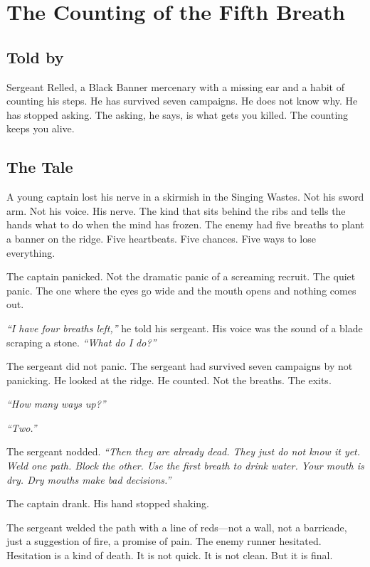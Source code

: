 \chapter{The Counting of the Fifth Breath}

\section*{Told by}
Sergeant Relled, a Black Banner mercenary with a missing ear and a habit of counting his steps. He has survived seven campaigns. He does not know why. He has stopped asking. The asking, he says, is what gets you killed. The counting keeps you alive.

\section*{The Tale}

A young captain lost his nerve in a skirmish in the Singing Wastes. Not his sword arm. Not his voice. His nerve. The kind that sits behind the ribs and tells the hands what to do when the mind has frozen. The enemy had five breaths to plant a banner on the ridge. Five heartbeats. Five chances. Five ways to lose everything.

The captain panicked. Not the dramatic panic of a screaming recruit. The quiet panic. The one where the eyes go wide and the mouth opens and nothing comes out.

\textit{``I have four breaths left,''} he told his sergeant. His voice was the sound of a blade scraping a stone. \textit{``What do I do?''}

The sergeant did not panic. The sergeant had survived seven campaigns by not panicking. He looked at the ridge. He counted. Not the breaths. The exits.

\textit{``How many ways up?''}

\textit{``Two.''}

The sergeant nodded. \textit{``Then they are already dead. They just do not know it yet. Weld one path. Block the other. Use the first breath to drink water. Your mouth is dry. Dry mouths make bad decisions.''}

The captain drank. His hand stopped shaking.

The sergeant welded the path with a line of reds—not a wall, not a barricade, just a suggestion of fire, a promise of pain. The enemy runner hesitated. Hesitation is a kind of death. It is not quick. It is not clean. But it is final.

